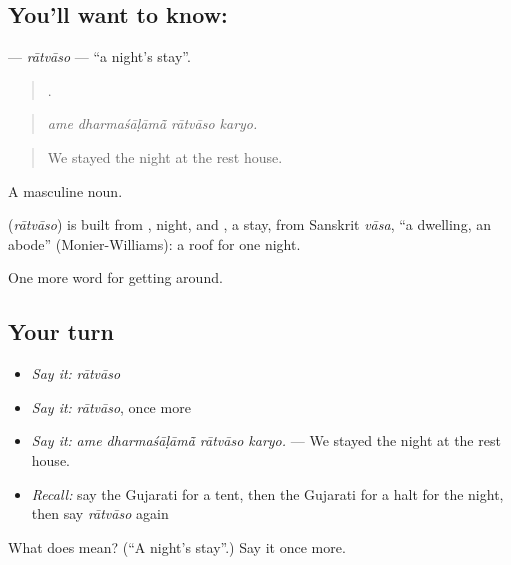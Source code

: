 \subsection*{You'll want to know: }
\textbf{} — \emph{rātvāso} — \textquotedblleft{}a night's stay\textquotedblright{}.

\begin{quote}
   .
\end{quote}

\begin{quote}
\emph{ame dharmaśāḷāmā̃ rātvāso karyo.}
\end{quote}

\begin{quote}
We stayed the night at the rest house.
\end{quote}

A masculine noun.

\begin{cousinweb}
\textbf{} (\emph{rātvāso}) is built from , night, and , a stay, from Sanskrit \emph{vāsa}, \textquotedblleft{}a dwelling, an abode\textquotedblright{} (Monier-Williams): a roof for one night.
\end{cousinweb}

\begin{grammarlens}[title={What you've built}]
One more word for getting around.
\end{grammarlens}

\subsection*{Your turn}
\begin{itemize}
\raggedright
  \item \emph{Say it:} \emph{rātvāso}
  \item \emph{Say it:} \emph{rātvāso}, once more
  \item \emph{Say it:} \emph{ame dharmaśāḷāmā̃ rātvāso karyo.} — We stayed the night at the rest house.
  \item \emph{Recall:} say the Gujarati for a tent, then the Gujarati for a halt for the night, then say \emph{rātvāso} again
\end{itemize}

\begin{tcolorbox}[breakable,colback=teal!4,colframe=teal!35!black,title={Before you move on}]
What does  mean? (\textquotedblleft{}A night's stay\textquotedblright{}.) Say it once more.
\end{tcolorbox}
